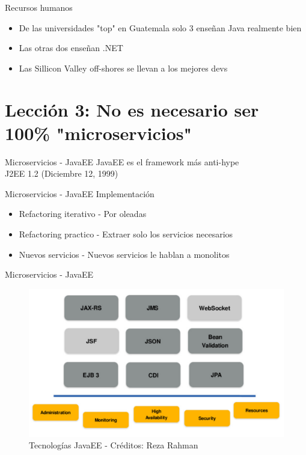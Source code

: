 \documentclass{beamer}
\begin{document}
\begin{frame}{Recursos humanos}
\begin{itemize}
	\item De las universidades "top" en Guatemala solo 3 enseñan Java realmente bien
	\item Las otras dos enseñan .NET
	\item Las Sillicon Valley off-shores se llevan a los mejores devs
\end{itemize}
\end{frame}


\section{Lección 3: No es necesario ser 100\% "microservicios"}
\begin{frame}{Microservicios - JavaEE}
JavaEE es el framework más anti-hype \\

\huge J2EE 1.2 (Diciembre 12, 1999)
\end{frame}


\begin{frame}{Microservicios - JavaEE}
Implementación
\begin{itemize}
	\item Refactoring iterativo - Por oleadas
	\item Refactoring practico - Extraer solo los servicios necesarios
	\item Nuevos servicios - Nuevos servicios le hablan a monolitos
\end{itemize}
\end{frame}


\begin{frame}{Microservicios - JavaEE}

\begin{figure}
	\centering
	\includegraphics[width=0.9\linewidth]{Images/javaeemicropancake.png}
	\caption{Tecnologías JavaEE - Créditos: Reza Rahman}
\end{figure}
\end{frame}
\end{document}
